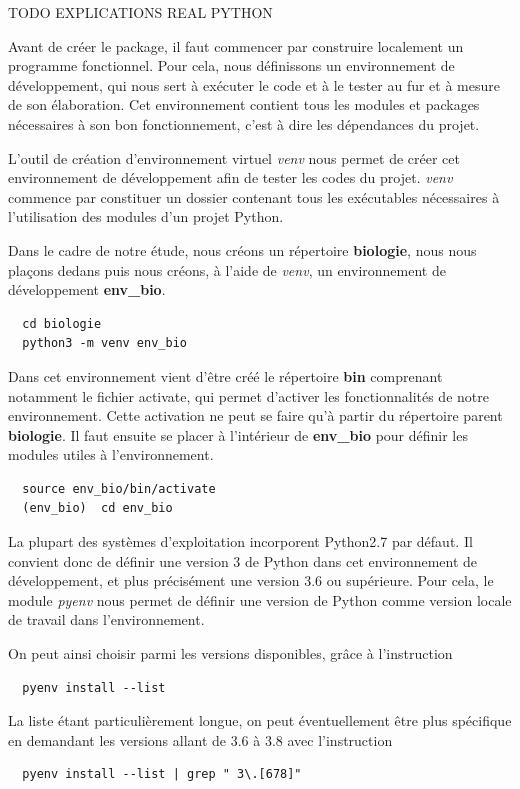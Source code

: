 \documentclass[twoside,a4paper,11pt,frenchb,openany]{report}
\begin{document}
TODO EXPLICATIONS REAL PYTHON

Avant de créer le package, il faut commencer par construire localement un programme fonctionnel. Pour cela, nous définissons un environnement de développement, qui nous sert à exécuter le code et à le tester au fur et à mesure de son élaboration. Cet environnement contient tous les modules et packages nécessaires à son bon fonctionnement, c'est à dire les dépendances du projet.
 
L'outil de création d'environnement virtuel \textit{venv} nous permet de créer cet environnement de développement afin de tester les codes du projet. \textit{venv} commence par constituer un dossier contenant tous les exécutables nécessaires à l'utilisation des modules d'un projet Python. 

Dans le cadre de notre étude, nous créons un répertoire \textbf{biologie}, nous nous plaçons dedans puis nous créons, à l'aide de \textit{venv}, un environnement de développement \textbf{env\_bio}. 
\begin{verbatim}  cd biologie
  python3 -m venv env_bio\end{verbatim}

Dans cet environnement vient d'être créé le répertoire \textbf{bin} comprenant notamment le fichier activate, qui permet d'activer les fonctionnalités de notre environnement.
Cette activation ne peut se faire qu'à partir du répertoire parent \textbf{biologie}. Il faut ensuite se placer à l'intérieur de \textbf{env\_bio} pour définir les modules utiles à l'environnement. 
 \begin{verbatim}  source env_bio/bin/activate
  (env_bio)  cd env_bio\end{verbatim}

La plupart des systèmes d'exploitation incorporent Python2.7 par défaut. Il convient donc de définir une version 3 de Python dans cet environnement de développement, et plus précisément une version 3.6 ou supérieure. Pour cela, le module \textit{pyenv}  nous permet de définir une version de Python comme version locale de travail dans l'environnement. 

On peut ainsi choisir parmi les versions disponibles, grâce à l'instruction
\begin{verbatim}  pyenv install --list\end{verbatim}
La liste étant particulièrement longue, on peut éventuellement être plus spécifique en demandant les versions allant de 3.6 à 3.8 avec l'instruction
\begin{verbatim}  pyenv install --list | grep " 3\.[678]"\end{verbatim}
\end{document}
